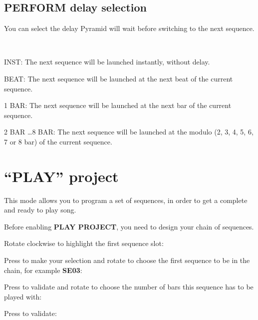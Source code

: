\subsection{PERFORM delay selection}

You can select the delay Pyramid will wait before switching to the next sequence.

\\

INST: The next sequence will be launched instantly, without delay.

BEAT: The next sequence will be launched at the next beat of the current sequence.

1 BAR: The next sequence will be launched at the next bar of the current sequence.

2 BAR \ldots 8 BAR: The next sequence will be launched at the modulo (2, 3, 4, 5, 6, 7 or 8 bar) of the current sequence.


\section{“PLAY” project}

This mode allows you to program a set of sequences, in order to get a complete and ready to play song.

Before enabling \textbf{PLAY PROJECT}, you need to design your chain of sequences.

Rotate clockwise \encodericon{} to highlight the first sequence slot:


Press \encodericon{} to make your selection and rotate \encodericon{} to choose the first sequence to be in the chain, for example \textbf{SE03}:


Press \encodericon{} to validate and rotate \encodericon{} to choose the number of bars this sequence has to be played with:



Press \encodericon{} to validate:

